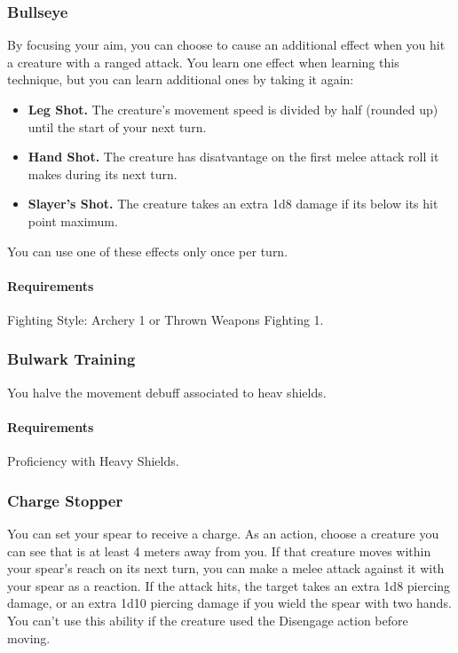 \subsubsection{Bullseye} \label{feat::bullseye}
    By focusing your aim, you can choose to cause an additional effect when you hit a creature with a ranged attack.
    You learn one effect when learning this technique, but you can learn additional ones by taking it again:
    \begin{itemize}
        \item \textbf{Leg Shot.} The creature's movement speed is divided by half (rounded up) until the start of your next turn.
        \item \textbf{Hand Shot.} The creature has disatvantage on the first melee attack roll it makes during its next turn.
        \item \textbf{Slayer's Shot.} The creature takes an extra 1d8 damage if its below its hit point maximum.
    \end{itemize}

    You can use one of these effects only once per turn.
    \paragraph{Requirements} Fighting Style: Archery 1 or Thrown Weapons Fighting 1.
\subsubsection{Bulwark Training} \label{feat::bulwarktraining}
    You halve the movement debuff associated to heav shields.
    \paragraph{Requirements} Proficiency with Heavy Shields.
\subsubsection{Charge Stopper} \label{feat::chargestopper}
    You can set your spear to receive a charge.
    As an action, choose a creature you can see that is at least 4 meters away from you.
    If that creature moves within your spear's reach on its next turn, you can make a melee attack against it with your spear as a reaction.
    If the attack hits, the target takes an extra 1d8 piercing damage, or an extra 1d10 piercing damage if you wield the spear with two hands.
    You can't use this ability if the creature used the Disengage action before moving.
